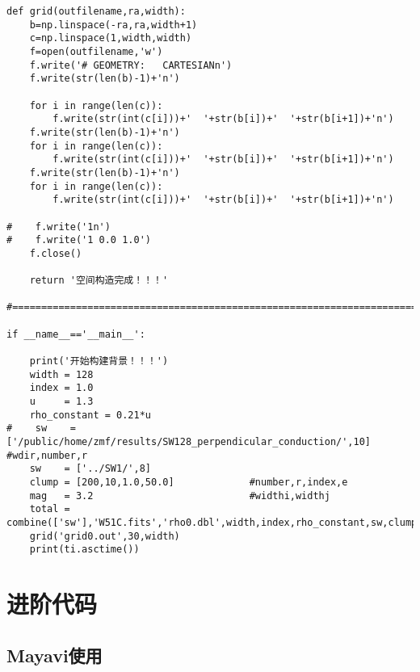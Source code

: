 \begin{lstlisting}
def grid(outfilename,ra,width):
    b=np.linspace(-ra,ra,width+1)
    c=np.linspace(1,width,width)
    f=open(outfilename,'w')
    f.write('# GEOMETRY:   CARTESIANn')
    f.write(str(len(b)-1)+'n')

    for i in range(len(c)):
        f.write(str(int(c[i]))+'  '+str(b[i])+'  '+str(b[i+1])+'n')
    f.write(str(len(b)-1)+'n')
    for i in range(len(c)):
        f.write(str(int(c[i]))+'  '+str(b[i])+'  '+str(b[i+1])+'n')
    f.write(str(len(b)-1)+'n')
    for i in range(len(c)):
        f.write(str(int(c[i]))+'  '+str(b[i])+'  '+str(b[i+1])+'n')

#    f.write('1n')
#    f.write('1 0.0 1.0')
    f.close()

    return '空间构造完成！！！'

#========================================================================

if __name__=='__main__':

    print('开始构建背景！！！')
    width = 128
    index = 1.0
    u     = 1.3
    rho_constant = 0.21*u
#    sw    = ['/public/home/zmf/results/SW128_perpendicular_conduction/',10]    #wdir,number,r
    sw    = ['../SW1/',8]
    clump = [200,10,1.0,50.0]             #number,r,index,e
    mag   = 3.2                           #widthi,widthj
    total = combine(['sw'],'W51C.fits','rho0.dbl',width,index,rho_constant,sw,clump,mag)
    grid('grid0.out',30,width)
    print(ti.asctime())

  \end{lstlisting}



\chapter{进阶代码}
\label{Further}

\section{Mayavi使用}
\label{Mayavi}

